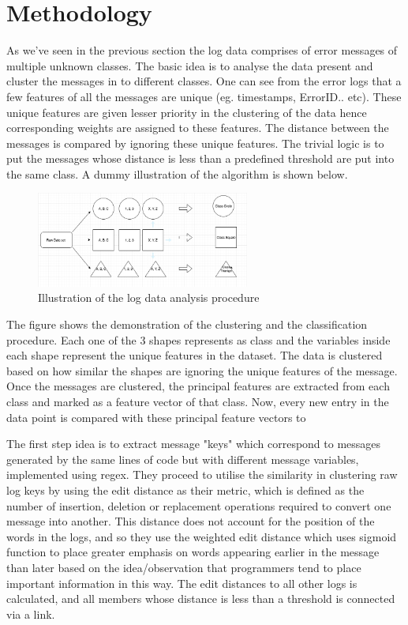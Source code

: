 
\section{Methodology}\label{sec:style}

As we've seen in the previous section the log data comprises of error messages of multiple unknown classes. The basic idea is to analyse the data present and cluster the messages in to different classes. One can see from the error logs that a few features of all the messages are unique (eg. timestamps, ErrorID.. etc). These unique features are given lesser priority in the clustering of the data  hence corresponding weights are assigned to these features. The distance between the messages is compared by ignoring these unique features. The trivial logic is to put the messages whose distance is less than a predefined threshold are put into the same class. A dummy illustration of the algorithm is shown below. 

\begin{figure}[htp]
    \centering
    \includegraphics[width=7cm]{img/proc.png}
    \caption{Illustration of the log data analysis procedure}
    \label{fig:galaxy}
\end{figure}

The figure shows the demonstration of the clustering and the classification procedure. Each one of the 3 shapes represents as class and the variables inside each shape represent the unique features in the dataset. The data is clustered based on how similar the shapes are ignoring the unique features of the message. Once the messages are clustered, the principal features are extracted from each class and marked as a feature vector of that class. Now, every new entry in the data point is compared with these principal feature vectors to 

The first step idea is to extract message "keys" which
correspond to messages generated by the same lines of code but with different message variables, implemented using regex. They proceed to utilise
the similarity in clustering raw log keys by using the edit distance as their
metric, which is defined as the number of insertion, deletion or replacement
operations required to convert one message into another. This distance does
not account for the position of the words in the logs, and so they use the
weighted edit distance which uses sigmoid function to place greater emphasis on words appearing earlier in the message than later based on the
idea/observation that programmers tend to place important information in
this way. The edit distances to all other logs is calculated, and all members
whose distance is less than a threshold is connected via a link. 

